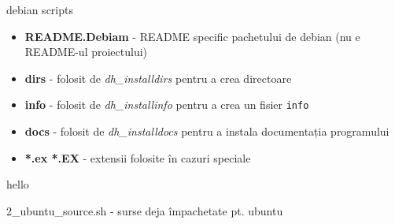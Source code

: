 \documentclass{beamer}
\begin{document}
\begin{frame}{debian\/ scripts}
  \begin{itemize}
    \begin{beamerboxesrounded}[lower=block body,shadow=true]{2\_rm\_unneeded.sh - delete unneeded files from debian\/}
      \small 
    \end{beamerboxesrounded}
  \item \textbf{README.Debiam} - README specific pachetului de debian (nu e README-ul proiectului)
  \item \textbf{dirs} - folosit de \textit{dh\_installdirs} pentru a crea directoare
  \item \textbf{info} - folosit de \textit{dh\_installinfo} pentru a crea un fisier \texttt{info}
  \item \textbf{docs} - folosit de \textit{dh\_installdocs} pentru a instala documentația programului
  \item \textbf{*.ex *.EX} - extensii folosite în cazuri speciale
  \end{itemize}
\end{frame}


\begin{frame}{hello}
  \begin{beamerboxesrounded}[lower=block body,shadow=true]{2\_ubuntu\_source.sh - surse deja împachetate pt. ubuntu}
    \small 
  \end{beamerboxesrounded}
\end{frame}
\end{document}
